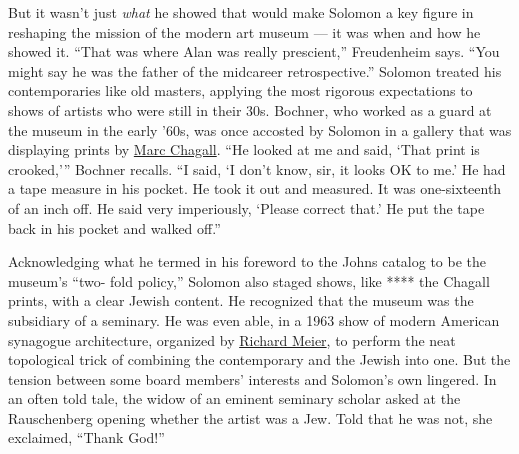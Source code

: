 But it wasn't just \emph{what} he showed that would make Solomon a key
figure in reshaping the mission of the modern art museum --- it was when
and how he showed it. ``That was where Alan was really prescient,''
Freudenheim says. ``You might say he was the father of the midcareer
retrospective.'' Solomon treated his contemporaries like old masters,
applying the most rigorous expectations to shows of artists who were
still in their 30s. Bochner, who worked as a guard at the museum in the
early '60s, was once accosted by Solomon in a gallery that was
displaying prints by
\href{https://www.nytimes.com/topic/person/marc-chagall}{Marc Chagall}.
``He looked at me and said, `That print is crooked,''' Bochner recalls.
``I said, `I don't know, sir, it looks OK to me.' He had a tape measure
in his pocket. He took it out and measured. It was one-sixteenth of an
inch off. He said very imperiously, `Please correct that.' He put the
tape back in his pocket and walked off.''

Acknowledging what he termed in his foreword to the Johns catalog to be
the museum's ``two- fold policy,'' Solomon also staged shows, like ****
the Chagall prints, with a clear Jewish content. He recognized that the
museum was the subsidiary of a seminary. He was even able, in a 1963
show of modern American synagogue architecture, organized by
\href{https://www.nytimes.com/topic/person/richard-meier}{Richard
Meier}, to perform the neat topological trick of combining the
contemporary and the Jewish into one. But the tension between some board
members' interests and Solomon's own lingered. In an often told tale,
the widow of an eminent seminary scholar asked at the Rauschenberg
opening whether the artist was a Jew. Told that he was not, she
exclaimed, ``Thank God!''

